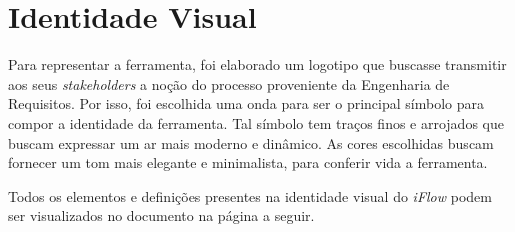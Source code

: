 \chapter{Identidade Visual}

\label{apendice:identidade_visual}

Para representar a ferramenta, foi elaborado um logotipo que buscasse transmitir aos seus \textit{stakeholders} a noção do processo proveniente da Engenharia de Requisitos. Por isso, foi escolhida uma onda para ser o principal símbolo para compor a identidade da ferramenta. Tal símbolo tem traços finos e arrojados que buscam expressar um ar mais moderno e dinâmico. As cores escolhidas buscam fornecer um tom mais elegante e minimalista, para conferir vida a ferramenta.

Todos os elementos e definições presentes na identidade visual do \textit{iFlow} podem ser visualizados no documento na página a seguir.

